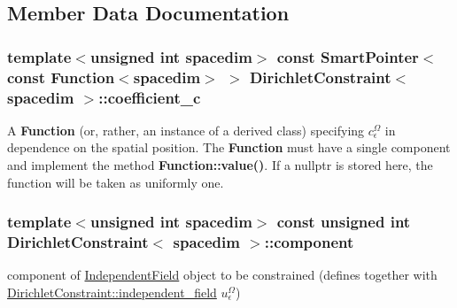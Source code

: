 \subsection{Member Data Documentation}
\subsubsection[{\texorpdfstring{coefficient\+\_\+c}{coefficient_c}}]{\setlength{\rightskip}{0pt plus 5cm}template$<$unsigned int spacedim$>$ const {\bf Smart\+Pointer}$<$const {\bf Function}$<$spacedim$>$ $>$ {\bf Dirichlet\+Constraint}$<$ spacedim $>$\+::coefficient\+\_\+c}\hypertarget{class_dirichlet_constraint_adea2dc6126a633b297eb7dfce832b9ef}{}\label{class_dirichlet_constraint_adea2dc6126a633b297eb7dfce832b9ef}
A {\bf Function} (or, rather, an instance of a derived class) specifying $c^\Omega_\epsilon$ in dependence on the spatial position. The {\bf Function} must have a single component and implement the method {\bf Function\+::value()}. If a {\ttfamily nullptr} is stored here, the function will be taken as uniformly one. 
\subsubsection[{\texorpdfstring{component}{component}}]{\setlength{\rightskip}{0pt plus 5cm}template$<$unsigned int spacedim$>$ const unsigned int {\bf Dirichlet\+Constraint}$<$ spacedim $>$\+::component}\hypertarget{class_dirichlet_constraint_a7e3c4d0e0906af1c81b88e05e41bdafc}{}\label{class_dirichlet_constraint_a7e3c4d0e0906af1c81b88e05e41bdafc}
component of \hyperlink{class_independent_field}{Independent\+Field} object to be constrained (defines together with \hyperlink{class_dirichlet_constraint_abbd7945a973ed93d1d773307393ffde3}{Dirichlet\+Constraint\+::independent\+\_\+field} $u^\Omega_\epsilon$) 
